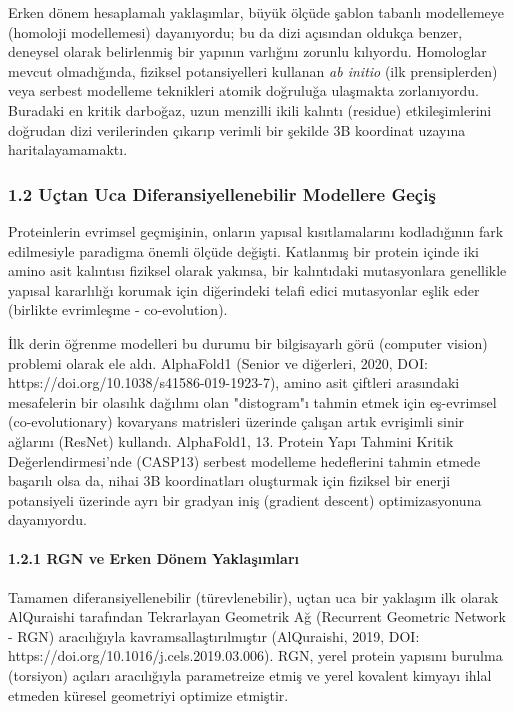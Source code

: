 \documentclass[11pt,a4paper]{article}
\begin{document}
Erken dönem hesaplamalı yaklaşımlar, büyük ölçüde şablon tabanlı modellemeye (homoloji modellemesi) dayanıyordu; bu da dizi açısından oldukça benzer, deneysel olarak belirlenmiş bir yapının varlığını zorunlu kılıyordu. Homologlar mevcut olmadığında, fiziksel potansiyelleri kullanan \textit{ab initio} (ilk prensiplerden) veya serbest modelleme teknikleri atomik doğruluğa ulaşmakta zorlanıyordu. Buradaki en kritik darboğaz, uzun menzilli ikili kalıntı (residue) etkileşimlerini doğrudan dizi verilerinden çıkarıp verimli bir şekilde 3B koordinat uzayına haritalayamamaktı.

\subsubsection{1.2 Uçtan Uca Diferansiyellenebilir Modellere Geçiş}
Proteinlerin evrimsel geçmişinin, onların yapısal kısıtlamalarını kodladığının fark edilmesiyle paradigma önemli ölçüde değişti. Katlanmış bir protein içinde iki amino asit kalıntısı fiziksel olarak yakınsa, bir kalıntıdaki mutasyonlara genellikle yapısal kararlılığı korumak için diğerindeki telafi edici mutasyonlar eşlik eder (birlikte evrimleşme - co-evolution).

İlk derin öğrenme modelleri bu durumu bir bilgisayarlı görü (computer vision) problemi olarak ele aldı. AlphaFold1 (Senior ve diğerleri, 2020, DOI: https://doi.org/10.1038/s41586-019-1923-7), amino asit çiftleri arasındaki mesafelerin bir olasılık dağılımı olan "distogram"ı tahmin etmek için eş-evrimsel (co-evolutionary) kovaryans matrisleri üzerinde çalışan artık evrişimli sinir ağlarını (ResNet) kullandı. AlphaFold1, 13. Protein Yapı Tahmini Kritik Değerlendirmesi'nde (CASP13) serbest modelleme hedeflerini tahmin etmede başarılı olsa da, nihai 3B koordinatları oluşturmak için fiziksel bir enerji potansiyeli üzerinde ayrı bir gradyan iniş (gradient descent) optimizasyonuna dayanıyordu.

\paragraph{1.2.1 RGN ve Erken Dönem Yaklaşımları}
Tamamen diferansiyellenebilir (türevlenebilir), uçtan uca bir yaklaşım ilk olarak AlQuraishi tarafından Tekrarlayan Geometrik Ağ (Recurrent Geometric Network - RGN) aracılığıyla kavramsallaştırılmıştır (AlQuraishi, 2019, DOI: https://doi.org/10.1016/j.cels.2019.03.006). RGN, yerel protein yapısını burulma (torsiyon) açıları aracılığıyla parametreize etmiş ve yerel kovalent kimyayı ihlal etmeden küresel geometriyi optimize etmiştir.
\end{document}
